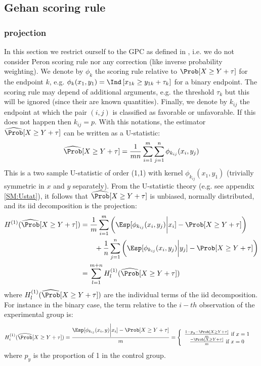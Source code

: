 \documentclass[12pt]{article}
\begin{document}
\subsection{Gehan scoring rule}
\label{sec:orga0c1e42}
\subsubsection{\Hajek projection}
\label{sec:orgffda209}

In this section we restrict ourself to the GPC as defined in
\citep{buyse2010generalized}, i.e. we do not consider Peron scoring rule
nor any correction (like inverse probability weighting). We denote by
\(\phi_{k}\) the scoring rule relative to \(\Prob[X \geq Y+\tau]\) for
the endpoint \(k\), e.g. \(\phi_{k}(x_{1},y_{1})=\Ind\left[x_{1k} \geq
y_{1k}+\tau_k\right]\) for a binary endpoint. The scoring rule may
depend of additional arguments, e.g. the threshold \(\tau_k\) but this
will be ignored (since their are known quantities). Finally, we denote
by \(k_{ij}\) the endpoint at which the pair \((i,j)\) is classified
as favorable or unfavorable. If this does not happen then
\(k_{ij}=p\). With this notations, the estimator \(\widehat{\Prob}[X
\geq Y+\tau]\) can be written as a U-statistic:
\begin{align*}
\widehat{\Prob}[X \geq Y+\tau] = \frac{1}{mn} \sum_{i=1}^m \sum_{j=1}^n \phi_{k_{ij}}(x_i,y_j)
\end{align*}
This is a two sample U-statistic of order (1,1) with kernel
\(\phi_{k_{ij}}(x_1,y_1)\) (trivially symmetric in \(x\) and \(y\)
separately). From the U-statistic theory (e.g. see appendix
\ref{SM:Ustat}), it follows that \(\widehat{\Prob}[X \geq Y+\tau]\) is
unbiased, normally distributed, and its iid decomposition is the
\Hajek projection:
\begin{align*}
H^{(1)}(\widehat{\Prob}[X \geq Y+\tau]) &= \frac{1}{m} \sum_{i=1}^m \left( \Esp[\phi_{k_{ij}}(x_i,y_j) \bigg| x_i] - \Prob[X \geq Y+\tau] \right) \\
& \qquad + \frac{1}{n} \sum_{j=1}^n \left( \Esp[\phi_{k_{ij}}(x_i,y_j) \bigg| y_j] - \Prob[X \geq Y+\tau]\right) \\
&= \sum_{l=1}^{m+n} H^{(1)}_l(\widehat{\Prob}[X \geq Y + \tau])
\end{align*}
where \(H^{(1)}_l(\widehat{\Prob}[X \geq Y + \tau])\) are the
individual terms of the iid decomposition. For instance in the binary
case, the term relative to the \(i-th\) observation of the
experimental group is:
\begin{align*}
H^{(1)}_i(\widehat{\Prob}[X \geq Y + \tau]) & = \frac{\Esp[\phi_{k_{ij}}(x_i,y) \bigg| x_i]-\Prob[X \geq Y+\tau]}{m} = \left\{ \begin{array}{cc} 
 \frac{1-p_y-\Prob[X \geq Y+\tau]}{m} \text{ if } x = 1 \\
\frac{-\Prob[X \geq Y+\tau]}{m} \text{ if } x = 0 \\
\end{array} \right. 
\end{align*}
where \(p_y\) is the proportion of 1 in the control group.
\end{document}
